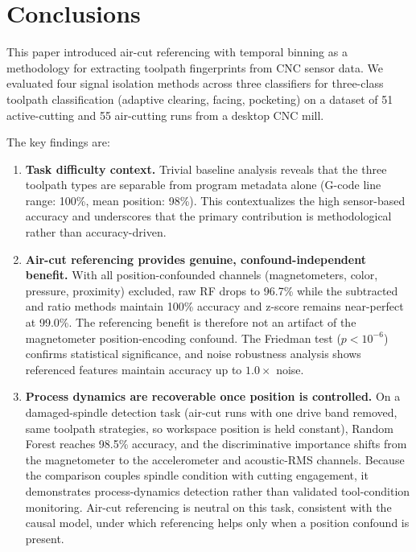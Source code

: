 \section{Conclusions}\label{sec:conclusion}

This paper introduced air-cut referencing with temporal binning as a methodology for extracting toolpath fingerprints from CNC sensor data. We evaluated four signal isolation methods across three classifiers for three-class toolpath classification (adaptive clearing, facing, pocketing) on a dataset of 51 active-cutting and 55 air-cutting runs from a desktop CNC mill.

The key findings are:

\begin{enumerate}
    \item \textbf{Task difficulty context.} Trivial baseline analysis reveals that the three toolpath types are separable from program metadata alone (G-code line range: 100\%, mean position: 98\%). This contextualizes the high sensor-based accuracy and underscores that the primary contribution is methodological rather than accuracy-driven.

    \item \textbf{Air-cut referencing provides genuine, confound-independent benefit.} With all position-confounded channels (magnetometers, color, pressure, proximity) excluded, raw RF drops to 96.7\% while the subtracted and ratio methods maintain 100\% accuracy and z-score remains near-perfect at 99.0\%. The referencing benefit is therefore not an artifact of the magnetometer position-encoding confound. The Friedman test ($p < 10^{-6}$) confirms statistical significance, and noise robustness analysis shows referenced features maintain accuracy up to $1.0\times$ noise.

    \item \textbf{Process dynamics are recoverable once position is controlled.} On a damaged-spindle detection task (air-cut runs with one drive band removed, same toolpath strategies, so workspace position is held constant), Random Forest reaches 98.5\% accuracy, and the discriminative importance shifts from the magnetometer to the accelerometer and acoustic-RMS channels. Because the comparison couples spindle condition with cutting engagement, it demonstrates process-dynamics detection rather than validated tool-condition monitoring. Air-cut referencing is neutral on this task, consistent with the causal model, under which referencing helps only when a position confound is present.


\end{enumerate}
